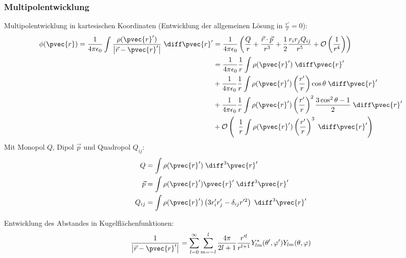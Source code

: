 \documentclass[11pt]{article}
\numberwithin{equation}{section}
\begin{document}
      \subsubsection{Multipolentwicklung}
        Multipolentwicklung in kartesischen Koordinaten (Entwicklung der allgemeinen Lösung in $\frac{r'}{r}=0$):
        \begin{equation}
          \begin{aligned}
            \phi(\pvec{r}) = \frac{1}{4\pi\epsilon_0}\int\frac{\rho(\pvec{r}')}{\left|\vec{r}-\pvec{r}'\right|}\;\diff \pvec{r}'
            &= \frac{1}{4\pi\epsilon_0}\left(\frac{Q}{r} + \frac{\vec{r}\cdot\vec{p}}{r^3} + \frac{1}{2}\frac{r_i r_j Q_{ij}}{r^5} + \mathcal{O} \left(\frac{1}{r^4}\right)\right) \\
            &= \frac{1}{4\pi\epsilon_0}\frac{1}{r}\int\rho(\pvec{r}')\;\diff \pvec{r}' \\
            &+ \frac{1}{4\pi\epsilon_0}\frac{1}{r}\int\rho(\pvec{r}')\left(\frac{r'}{r}\right)\cos\theta\;\diff \pvec{r}' \\
            &+ \frac{1}{4\pi\epsilon_0}\frac{1}{r}\int\rho(\pvec{r}')\left(\frac{r'}{r}\right)^2\frac{3\cos^2\theta-1}{2}\;\diff \pvec{r}' \\
            &+ \mathcal{O}\left(\;\;\frac{1}{r}\int\rho(\pvec{r}')\left(\frac{r'}{r}\right)^3 \;\diff \pvec{r}'\right) \\
          \end{aligned}
        \end{equation}
        Mit Monopol $Q$, Dipol $\vec{p}$ und Quadropol $Q_{ij}$:
        \begin{equation}
          \begin{aligned}
            Q &= \int \rho(\pvec{r}') \;\diff^3 \pvec{r}' \\
            \vec{p} &= \int \rho(\pvec{r}')\pvec{r}' \;\diff^3 \pvec{r}' \\
            Q_{ij} &= \int \rho(\pvec{r}')\left(3r'_i r'_j - \delta_{ij} r'^2 \right)  \;\diff^3 \pvec{r}' \\
          \end{aligned}
        \end{equation}

        Entwicklung des Abstandes in Kugelflächenfunktionen:
        \begin{equation}
          \frac{1}{\left|\vec{r}-\pvec{r}'\right|}=\sum_{l=0}^{\infty}\sum_{m=-l}^{l} \frac{4\pi}{2l+1}\frac{r'^l}{r^{l+1}} Y^{*}_{lm}(\theta',\varphi')Y_{lm}(\theta,\varphi)
        \end{equation}
\end{document}
